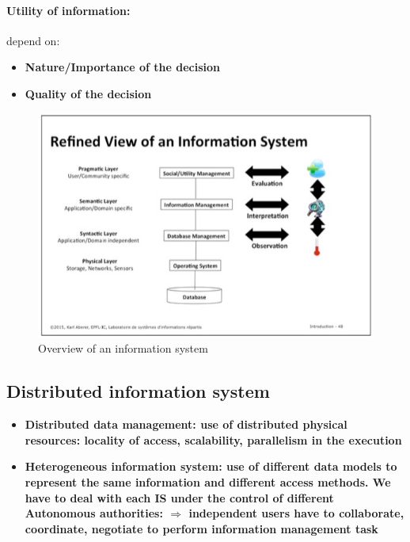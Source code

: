 \paragraph{Utility of information:} depend on:
\begin{itemize}
	\item \bf{Nature/Importance} of the decision
	\item \bf{Quality} of the decision
\end{itemize}

\begin{figure}[!ht]
\begin{center}
\includegraphics[width=1\linewidth]{figures/viewIS.jpg}
\end{center}
\caption{Overview of an information system}
\end{figure}

\subsection{Distributed information system}
\begin{itemize}
	\item \bf{Distributed data management:} use of distributed physical resources: locality of access, scalability, parallelism in the execution
	\item \bf{Heterogeneous information system:} use of different data models to represent the same information and different access methods. We have to deal with each IS under the control of different \bf{Autonomous authorities:} $\Rightarrow$ independent users have to collaborate, coordinate, negotiate to perform information management task
\end{itemize}

